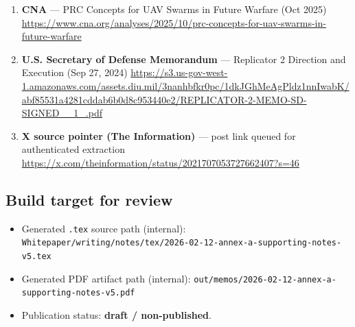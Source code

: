 \documentclass[
]{article}
\providecommand{\tightlist}{%
  \setlength{\itemsep}{0pt}\setlength{\parskip}{0pt}}
\begin{document}
\begin{enumerate}
  the Drone Age (Sep 2025)
  \url{https://s3.us-east-1.amazonaws.com/files.cnas.org/documents/Report_CUAS_Defense_Sep-2025_final.pdf}
\item
  \textbf{CNA} --- PRC Concepts for UAV Swarms in Future Warfare (Oct
  2025)
  \url{https://www.cna.org/analyses/2025/10/prc-concepts-for-uav-swarms-in-future-warfare}
\item
  \textbf{U.S. Secretary of Defense Memorandum} --- Replicator 2
  Direction and Execution (Sep 27, 2024)
  \url{https://s3.us-gov-west-1.amazonaws.com/assets.diu.mil/3nanhbfkr0pc/1dkJGhMeAgPldz1nnIwabK/abf85531a4281cddab6b0d8c953440e2/REPLICATOR-2-MEMO-SD-SIGNED__1_.pdf}
\item
  \textbf{X source pointer (The Information)} --- post link queued for
  authenticated extraction
  \url{https://x.com/theinformation/status/2021707053727662407?s=46}
\end{enumerate}

\hypertarget{build-target-for-review}{%
\subsection{Build target for review}\label{build-target-for-review}}

\begin{itemize}
\tightlist
\item
  Generated \texttt{.tex} source path (internal):
  \texttt{Whitepaper/writing/notes/tex/2026-02-12-annex-a-supporting-notes-v5.tex}
\item
  Generated PDF artifact path (internal):
  \texttt{out/memos/2026-02-12-annex-a-supporting-notes-v5.pdf}
\item
  Publication status: \textbf{draft / non-published}.
\end{itemize}
\end{document}
